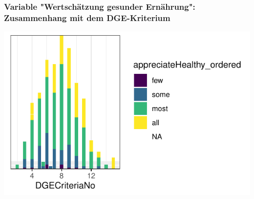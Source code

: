 \begin{frame}[fragile]
\frametitle{Variable "Wertschätzung gesunder Ernährung": Zusammenhang mit dem DGE-Kriterium}
\begin{knitrout}\footnotesize
{}\color{fgcolor}\begin{kframe}


{\ttfamily\noindent\color{warningcolor}{\#\# Warning: Removed 244 rows containing missing values (position\_stack).}}\end{kframe}

{\centering \includegraphics[width=\maxwidth]{figure/beamer-appreciateDGEplot-1} 

}



\end{knitrout}
\end{frame}

